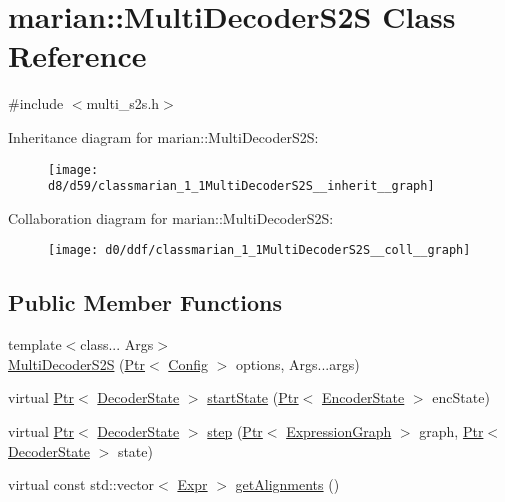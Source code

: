 \hypertarget{classmarian_1_1MultiDecoderS2S}{}\section{marian\+:\+:Multi\+Decoder\+S2S Class Reference}
\label{classmarian_1_1MultiDecoderS2S}


{\ttfamily \#include $<$multi\+\_\+s2s.\+h$>$}



Inheritance diagram for marian\+:\+:Multi\+Decoder\+S2S\+:
\nopagebreak
\begin{figure}[H]
\begin{center}
\leavevmode
\texttt{[image: d8/d59/classmarian\_1\_1MultiDecoderS2S\_\_inherit\_\_graph]}
\end{center}
\end{figure}


Collaboration diagram for marian\+:\+:Multi\+Decoder\+S2S\+:
\nopagebreak
\begin{figure}[H]
\begin{center}
\leavevmode
\texttt{[image: d0/ddf/classmarian\_1\_1MultiDecoderS2S\_\_coll\_\_graph]}
\end{center}
\end{figure}
\subsection*{Public Member Functions}
\begin{DoxyCompactItemize}
\item 
{\footnotesize template$<$class... Args$>$ }\\\hyperlink{classmarian_1_1MultiDecoderS2S_a68eed32b91e7a057d3311669c15b91d2}{Multi\+Decoder\+S2S} (\hyperlink{namespacemarian_ad1a373be43a00ef9ce35666145137b08}{Ptr}$<$ \hyperlink{classmarian_1_1Config}{Config} $>$ options, Args...\+args)
\item 
virtual \hyperlink{namespacemarian_ad1a373be43a00ef9ce35666145137b08}{Ptr}$<$ \hyperlink{classmarian_1_1DecoderState}{Decoder\+State} $>$ \hyperlink{classmarian_1_1MultiDecoderS2S_a3facd6e243c6fd8d656b49dedbba4948}{start\+State} (\hyperlink{namespacemarian_ad1a373be43a00ef9ce35666145137b08}{Ptr}$<$ \hyperlink{classmarian_1_1EncoderState}{Encoder\+State} $>$ enc\+State)
\item 
virtual \hyperlink{namespacemarian_ad1a373be43a00ef9ce35666145137b08}{Ptr}$<$ \hyperlink{classmarian_1_1DecoderState}{Decoder\+State} $>$ \hyperlink{classmarian_1_1MultiDecoderS2S_a6f0421ce42840c6198f3d450b3d55bfb}{step} (\hyperlink{namespacemarian_ad1a373be43a00ef9ce35666145137b08}{Ptr}$<$ \hyperlink{classmarian_1_1ExpressionGraph}{Expression\+Graph} $>$ graph, \hyperlink{namespacemarian_ad1a373be43a00ef9ce35666145137b08}{Ptr}$<$ \hyperlink{classmarian_1_1DecoderState}{Decoder\+State} $>$ state)
\item 
virtual const std\+::vector$<$ \hyperlink{namespacemarian_a498d8baf75b754011078b890b39c8e12}{Expr} $>$ \hyperlink{classmarian_1_1MultiDecoderS2S_a9d82178076ee276d1f83ac4e040d959b}{get\+Alignments} ()
\end{DoxyCompactItemize}
